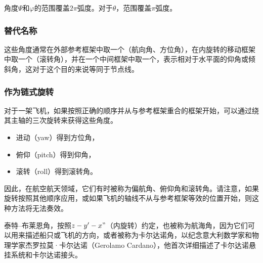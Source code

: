 角度$\Psi$和$\varphi$的范围覆盖$2\pi$弧度。对于$\theta$，范围覆盖$\pi$弧度。
\subsubsection{替代名称}  
这些角度通常在外部参考框架中取一个（航向角、方位角），在内旋转的移动框架中取一个（滚转角），并在一个中间框架中取一个，表示相对于水平面的仰角或倾斜角，这对于这个目的来说等同于节点线。
\subsubsection{作为链式旋转}
对于一架飞机，如果按照正确的顺序并从与参考框架重合的框架开始，可以通过绕其主轴的三次旋转来获得这些角度。
\begin{itemize}
\item 进动（yaw）得到方位角，
\item 俯仰（pitch）得到仰角，
\item 滚转（roll）得到滚转角。
\end{itemize}
因此，在航空航天领域，它们有时被称为偏航角、俯仰角和滚转角。请注意，如果旋转按照其他顺序应用，或如果飞机的轴线不从与参考框架等效的位置开始，则这种方法将无法奏效。

泰特–布莱恩角，按照$z-y'-x"$（内旋转）约定，也被称为航海角，因为它们可以用来描述船只或飞机的方向，或者被称为卡尔达诺角，以纪念意大利数学家和物理学家杰罗拉莫·卡尔达诺（Gerolamo Cardano），他首次详细描述了卡尔达诺悬挂系统和卡尔达诺接头。